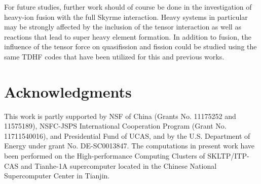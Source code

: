 For future studies, further work should of course be done in the investigation of heavy-ion fusion with the full Skyrme interaction.
Heavy systems in particular may be strongly affected by the inclusion of the tensor interaction as well as reactions that lead to super heavy element formation.
In addition to fusion, the influence of the tensor force on quasifission and fission could be studied using the same TDHF codes that have been utilized for this and previous works.


\label{summary}

\section*{Acknowledgments}
This work is partly supported by NSF of China (Grants No. 11175252 and 11575189),
NSFC-JSPS International Cooperation Program (Grant No. 11711540016), and Presidential Fund of UCAS,
and by the U.S. Department of Energy under grant No. DE-SC0013847.
The computations in present work have been performed on the High-performance Computing Clusters of SKLTP/ITP-CAS and
Tianhe-1A supercomputer located in the Chinese National Supercomputer Center in Tianjin.


\clearpage

